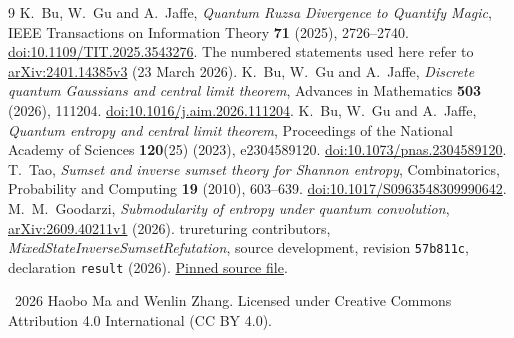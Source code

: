 \documentclass[10pt]{article}
\begin{document}
\begin{thebibliography}{9}
\setlength{\itemsep}{0pt}
 K.~Bu, W.~Gu and A.~Jaffe,
\emph{Quantum Ruzsa Divergence to Quantify Magic},
IEEE Transactions on Information Theory \textbf{71} (2025), 2726--2740.
\href{https://doi.org/10.1109/TIT.2025.3543276}{doi:10.1109/TIT.2025.3543276}.
The numbered statements used here refer to
\href{https://arxiv.org/abs/2401.14385v3}{arXiv:2401.14385v3} (23 March 2026).
 K.~Bu, W.~Gu and A.~Jaffe,
\emph{Discrete quantum Gaussians and central limit theorem},
Advances in Mathematics \textbf{503} (2026), 111204.
\href{https://doi.org/10.1016/j.aim.2026.111204}{doi:10.1016/j.aim.2026.111204}.
 K.~Bu, W.~Gu and A.~Jaffe,
\emph{Quantum entropy and central limit theorem},
Proceedings of the National Academy of Sciences \textbf{120}(25) (2023), e2304589120.
\href{https://doi.org/10.1073/pnas.2304589120}{doi:10.1073/pnas.2304589120}.
 T.~Tao,
\emph{Sumset and inverse sumset theory for Shannon entropy},
Combinatorics, Probability and Computing \textbf{19} (2010), 603--639.
\href{https://doi.org/10.1017/S0963548309990642}{doi:10.1017/S0963548309990642}.
 M.~M.~Goodarzi,
\emph{Submodularity of entropy under quantum convolution},
\href{https://arxiv.org/abs/2609.40211v1}{arXiv:2609.40211v1} (2026).
 trureturing contributors,
\emph{MixedStateInverseSumsetRefutation}, source development,
revision \texttt{57b811c}, declaration \texttt{result} (2026).
\href{https://github.com/the-omega-institute/trureturing/blob/57b811cedb64c8065c6afac0da57d0fe2c8aa5ab/D5/S3/Quantum/Magic/MixedStateInverseSumsetRefutation.lean}{Pinned source file}.
\end{thebibliography}

\smallskip\noindent\small
\textcopyright\ 2026 Haobo Ma and Wenlin Zhang.
Licensed under Creative Commons Attribution 4.0 International (CC BY 4.0).
\end{document}
